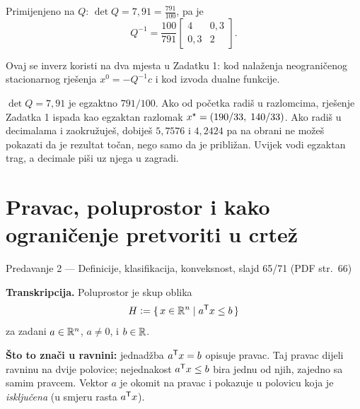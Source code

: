 Primijenjeno na $Q$: $\det Q = 7{,}91 = \tfrac{791}{100}$, pa je
\begin{equation}
Q^{-1} = \frac{100}{791} \begin{bmatrix} 4 & 0{,}3 \\ 0{,}3 & 2 \end{bmatrix}.
\label{eq:alat-Q-inv}
\end{equation}

Ovaj se inverz koristi na dva mjesta u Zadatku 1: kod nalaženja neograničenog
stacionarnog rješenja $x^{0} = -Q^{-1}c$ i kod izvoda dualne funkcije.

\begin{zamka}
$\det Q = 7{,}91$ je egzaktno $791/100$. Ako od početka radiš u razlomcima,
rješenje Zadatka 1 ispada kao egzaktan razlomak $x^{\star} = (190/33,\; 140/33)$.
Ako radiš u decimalama i zaokružuješ, dobiješ $5{,}7576$ i $4{,}2424$ pa na
obrani ne možeš pokazati da je rezultat točan, nego samo da je približan. Uvijek
vodi egzaktan trag, a decimale piši uz njega u zagradi.
\end{zamka}

\section{Pravac, poluprostor i kako ograničenje pretvoriti u crtež}
\label{sec:poluprostor}

\begin{izvor}{Predavanje 2 --- Definicije, klasifikacija, konveksnost, slajd 65/71 (PDF str.~66)}

\textbf{Transkripcija.} Poluprostor je skup oblika
\[
H \mathrel{\vcentcolon=} \{\, x \in \mathbb{R}^n \mid a^{\mathsf{T}} x \leq b \,\}
\]
za zadani $a \in \mathbb{R}^n$, $a \neq 0$, i $b \in \mathbb{R}$.

\textbf{Što to znači u ravnini:} jednadžba $a^{\mathsf{T}} x = b$ opisuje pravac. Taj
pravac dijeli ravninu na dvije polovice; nejednakost $a^{\mathsf{T}} x \leq b$ bira
jednu od njih, zajedno sa samim pravcem. Vektor $a$ je okomit na pravac i
pokazuje u polovicu koja je \emph{isključena} (u smjeru rasta $a^{\mathsf{T}} x$).
\end{izvor}

